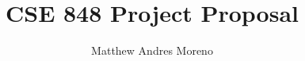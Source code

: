 \documentclass[12pt]{article}
\title{CSE 848 Project Proposal}
\author {Matthew Andres Moreno}
\theoremstyle{definition}
\begin{document}
\section*{\thetitle}

















\end{document}
